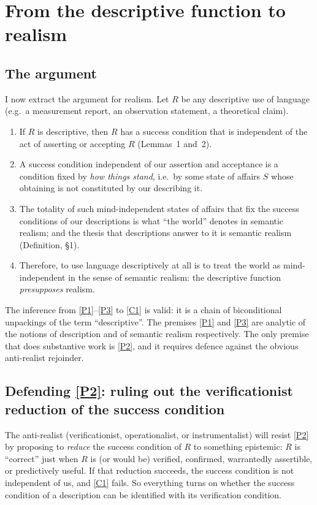 \documentclass[12pt]{article}
\begin{document}
\section{From the descriptive function to realism}

\subsection{The argument}

I now extract the argument for realism. Let $R$ be any descriptive use of
language (e.g.\ a measurement report, an observation statement, a
theoretical claim).

\begin{enumerate}[label=(P\arabic*),leftmargin=2.4em]
\item\label{P1} If $R$ is descriptive, then $R$ has a success condition
that is independent of the act of asserting or accepting $R$ (Lemmas~1
and~2).
\item\label{P2} A success condition independent of our assertion and
acceptance is a condition fixed by \emph{how things stand}, i.e.\ by some
state of affairs $S$ whose obtaining is not constituted by our describing
it.
\item\label{P3} The totality of such mind-independent states of affairs
that fix the success conditions of our descriptions is what ``the world''
denotes in semantic realism; and the thesis that descriptions answer to
it is semantic realism (Definition, \S1).
\item\label{C1} Therefore, to use language descriptively at all is to
treat the world as mind-independent in the sense of semantic realism: the
descriptive function \emph{presupposes} realism.
\end{enumerate}

The inference from \ref{P1}--\ref{P3} to \ref{C1} is valid: it is a chain
of biconditional unpackings of the term ``descriptive''. The premises
\ref{P1} and \ref{P3} are analytic of the notions of description and of
semantic realism respectively. The only premise that does substantive
work is \ref{P2}, and it requires defence against the obvious
anti-realist rejoinder.

\subsection{Defending \ref{P2}: ruling out the verificationist reduction
of the success condition}

The anti-realist (verificationist, operationalist, or instrumentalist)
will resist \ref{P2} by proposing to \emph{reduce} the success condition
of $R$ to something epistemic: $R$ is ``correct'' just when $R$ is (or
would be) verified, confirmed, warrantedly assertible, or predictively
useful. If that reduction succeeds, the success condition is not
independent of us, and \ref{C1} fails. So everything turns on whether the
success condition of a description can be identified with its
verification condition.
\end{document}
